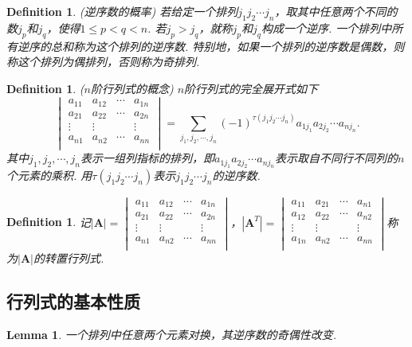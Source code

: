 \documentclass{article}
\newtheorem{lemma}[theorem]{Lemma}
\newtheorem{definition}[theorem]{Definition}
\newcommand{\mbf}[1]{\mathbf{#1}}
\begin{document}
\begin{definition}
\rm {\color{red} (逆序数的概率)} 若给定一个排列$j_1j_2\cdots j_n$，取其中任意两个不同的数$j_p$和$j_q$，使得$1 \leq p< q <n$. 若$j_p > j_q$，就称$j_p$和$j_q$构成一个{\color{red}逆序}. 一个排列中所有逆序的总和称为这个排列的{\color{red}逆序数}. 特别地，如果一个排列的逆序数是偶数，则称这个排列为{\color{red}偶排列}，否则称为{\color{red}奇排列}.
\end{definition}

\begin{definition}
\rm {\color{red} ($n$阶行列式的概念)} $n$阶行列式的{\color{red}完全展开式}如下
$$
\begin{vmatrix}
a_{11} & a_{12} & \cdots & a_{1n} \\
a_{21} & a_{22} & \cdots & a_{2n} \\
\vdots & \vdots & 		 & \vdots \\
a_{n1} & a_{n2} & \cdots & a_{nn} \\
\end{vmatrix}
=\sum\limits_{j_1,j_2,\cdots,j_n} (-1)^{\tau(j_1j_2\cdots j_n)} a_{1j_1}a_{2j_2}\cdots a_{nj_n}.
$$
其中$j_1,j_2,\cdots,j_n$表示一组列指标的排列，即$a_{1j_1}a_{2j_2}\cdots a_{nj_n}$表示取自不同行不同列的$n$个元素的乘积. 用$\tau(j_1j_2\cdots j_n)$表示$j_1j_2\cdots j_n$的逆序数.  
\end{definition}

\begin{definition}
\rm 记$|\mathbf{A}| = \begin{vmatrix}
a_{11} & a_{12} & \cdots & a_{1n} \\
a_{21} & a_{22} & \cdots & a_{2n} \\
\vdots & \vdots & 		 & \vdots \\
a_{n1} & a_{n2} & \cdots & a_{nn} \\
\end{vmatrix}$，$|\mathbf{A}^T| = \begin{vmatrix}
a_{11} & a_{21} & \cdots & a_{n1} \\
a_{12} & a_{22} & \cdots & a_{n2} \\
\vdots & \vdots & 		 & \vdots \\
a_{1n} & a_{n2} & \cdots & a_{nn} \\
\end{vmatrix}$称为$|\mbf{A}|$的{\color{red}转置行列式}.
\end{definition}

\newpage
\subsection{行列式的基本性质}
\begin{lemma}\label{det: nixu}
\rm 一个排列中任意两个元素对换，其逆序数的奇偶性改变.
\end{lemma}
\end{document}
